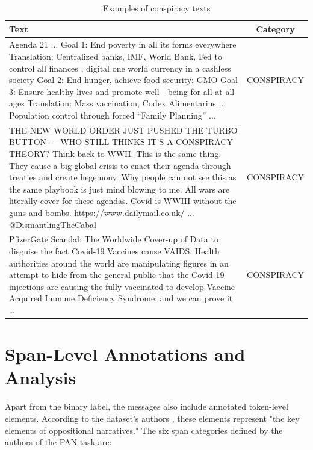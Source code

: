 \documentclass{Configuration_Files/PoliMi3i_thesis}
\begin{document}
\begin{table}[h]
    \centering
    \renewcommand{\arraystretch}{1.5} 
    \begin{tabular}{p{12cm}c}
        \hline
        \textbf{Text} & \textbf{Category} \\
        \hline
        Agenda 21 ... Goal 1: End poverty in all its forms everywhere Translation: Centralized banks, IMF, World Bank, Fed to control all finances , digital one world currency in a cashless society Goal 2: End hunger, achieve food security: GMO Goal 3: Ensure healthy lives and promote well - being for all at all ages Translation: Mass vaccination, Codex Alimentarius ... Population control through forced “Family Planning” ... & CONSPIRACY \\
        \hline
        THE NEW WORLD ORDER JUST PUSHED THE TURBO BUTTON - - WHO STILL THINKS IT'S A CONSPIRACY THEORY? Think back to WWII. This is the same thing. They cause a big global crisis to enact their agenda through treaties and create hegemony. Why people can not see this as the same playbook is just mind blowing to me. All wars are literally cover for these agendas. Covid is WWIII without the guns and bombs.  https://www.dailymail.co.uk/ ... @DismantlingTheCabal  & CONSPIRACY \\
        \hline
        PfizerGate Scandal: The Worldwide Cover-up of Data to disguise the fact Covid-19 Vaccines cause VAIDS. Health authorities around the world are manipulating figures in an attempt to hide from the general public that the Covid-19 injections are causing the fully vaccinated to develop Vaccine Acquired Immune Deficiency Syndrome; and we can prove it … & CONSPIRACY \\
        \hline
    \end{tabular}
    \caption{\small  Examples of conspiracy texts}
    \label{tab:example_binary_task_conspiracy_text}
\end{table}
\FloatBarrier

\section{Span-Level Annotations and Analysis} \label{sec:span_level_annotations_analysis}
Apart from the binary label, the messages also include annotated token-level elements. According to the dataset's authors \cite{korenvcic2024distinguishes}, these elements represent "the key elements of oppositional narratives." The six span categories defined by the authors of the PAN task are:
\end{document}
